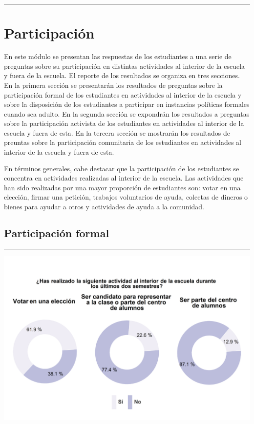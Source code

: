 \documentclass[
  14pt,
]{book}
\let\origfigure\figure
\let\endorigfigure\endfigure
\renewenvironment{figure}[1][2] {
  \expandafter\origfigure\expandafter[H]
} {
  \endorigfigure
}
\begin{document}
\begin{center}\rule{0.5\linewidth}{0.5pt}\end{center}

\hypertarget{participaciuxf3n}{%
\chapter{Participación}\label{participaciuxf3n}}

En este módulo se presentan las respuestas de los estudiantes a una serie de preguntas sobre su participación en distintas actividades al interior de la escuela y fuera de la escuela. El reporte de los resultados se organiza en tres secciones. En la primera sección se presentarán los resultados de preguntas sobre la participación formal de los estudiantes en actividades al interior de la escuela y sobre la disposición de los estudiantes a participar en instancias políticas formales cuando sea adulto. En la segunda sección se expondrán los resultados a preguntas sobre la participación activista de los estudiantes en actividades al interior de la escuela y fuera de esta. En la tercera sección se mostrarán los resultados de preuntas sobre la participación comunitaria de los estudiantes en actividades al interior de la escuela y fuera de esta.

En términos generales, cabe destacar que la participación de los estudiantes se concentra en actividades realizadas al interior de la escuela. Las actividades que han sido realizadas por una mayor proporción de estudiantes son: votar en una elección, firmar una petición, trabajos voluntarios de ayuda, colectas de dineros o bienes para ayudar a otros y actividades de ayuda a la comunidad.

\hypertarget{participaciuxf3n-formal}{%
\section{Participación formal}\label{participaciuxf3n-formal}}

\begin{center}\rule{0.5\linewidth}{0.5pt}\end{center}

\begin{figure}[!ht]

{\centering \includegraphics[width=0.8\linewidth,]{images/graph_partform_act} 

}

\caption{Participación formal al interior de la escuela}\label{fig:unnamed-chunk-53}
\end{figure}
\end{document}
